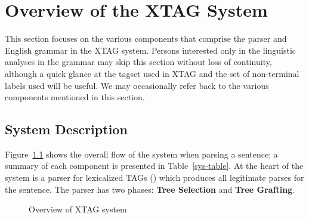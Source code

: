 \chapter{Overview of the XTAG System}
\label{overview}

This section focuses on the various components that comprise the
parser and English grammar in the XTAG system.  Persons interested
only in the linguistic analyses in the grammar may skip this section
without loss of continuity, although a quick glance at the tagset used
in XTAG and the set of non-terminal labels used will be useful. We may
occasionally refer back to the various components mentioned in this
section.

\section{System Description}

Figure~{\ref{flowchart}} shows the overall flow of the system when
parsing a sentence; a summary of each component is presented in
Table~\ref{sys-table}. At the heart of the system is a parser for
lexicalized TAGs (\cite{schabesjoshi88,schabes90}) which produces all
legitimate parses for the sentence. The parser has two phases: {\bf
Tree Selection} and {\bf Tree Grafting}.

\begin{figure}[t]
\hspace{0.35in}
\centering
{}
\caption[XTAG system diagram]{Overview of XTAG system }
\label{flowchart}
\end{figure}

